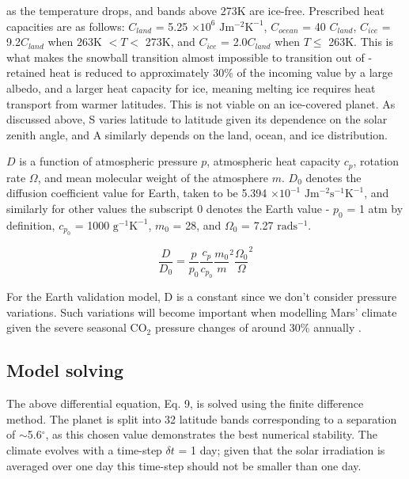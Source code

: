 \documentclass[12pt,onecolumn]{revtex4-2}    %
\begin{document}
as the temperature drops, and bands above 273K are ice-free. Prescribed heat capacities are as follows: $C_{land}$ = 5.25 $\times 10^{6}$ $\mathrm{Jm^{-2}K^{-1}}$, $C_{ocean}$ = 40 $C_{land}$, $C_{ice}$ = 9.2$C_{land}$ when 263K $< T <$ 273K, and $C_{ice}$ = 2.0$C_{land}$ when $T \le$ 263K. This is what makes the snowball transition almost impossible to transition out of - retained heat is reduced to approximately 30\% of the incoming value by a large albedo, and a larger heat capacity for ice, meaning melting ice requires heat transport from warmer latitudes. This is not viable on an ice-covered planet. As discussed above, S varies latitude to latitude given its dependence on the solar zenith angle, and A similarly depends on the land, ocean, and ice distribution. 
\

$D$ is a function of atmospheric pressure $p$, atmospheric heat capacity $c_{p}$, rotation rate $\Omega$, and mean molecular weight of the atmosphere $m$. $D_{0}$ denotes the diffusion coefficient value for Earth, taken to be 5.394 $\times 10^{-1}$ $\mathrm{J m^{-2} s^{-1} K^{-1}}$, and similarly for other values the subscript 0 denotes the Earth value - $p_{0}$ = 1 atm by definition, $c_{p_{0}}$ = 1000 $\mathrm{g^{-1}K^{-1}}$, $m_{0}$ = 28, and $\Omega_{0}$ = 7.27 $\mathrm{rad s^{-1}}$.

\begin{equation}
\frac{D}{D_{0}} = \frac{p}{p_{0}} \frac{c_{p}}{c_{p_{0}}} {\frac{m_{0}}{m}}^{2} {\frac{\Omega_{0}}{\Omega}}^{2}
\end{equation}

For the Earth validation model, D is a constant since we don't consider pressure variations. Such variations will become important when modelling Mars' climate given the severe seasonal $\mathrm{CO_2}$ pressure changes of around 30\% annually \cite{FHT98}.

\subsection{Model solving}
The above differential equation, Eq. 9, is solved using the finite difference method. The planet is split into 32 latitude bands corresponding to a separation of $\sim$5.6$^{\circ}$, as this chosen value demonstrates the best numerical stability. The climate evolves with a time-step $\delta t$ = 1 day; given that the solar irradiation is averaged over one day this time-step should not be smaller than one day.
\end{document}
